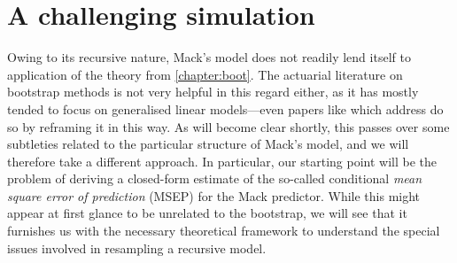 \documentclass[a4paper]{book}
\begin{document}
\section{A challenging simulation} \label{sec:mack-challenge}

Owing to its recursive nature, Mack's model does not readily lend itself to application of the theory from \cref{chapter:boot}. The actuarial literature on bootstrap methods is not very helpful in this regard either, as it has mostly tended to focus on generalised linear models---even papers like \cite{england:dist} which address  do so by reframing it in this way. As will become clear shortly, this passes over some subtleties related to the particular structure of Mack's model, and we will therefore take a different approach. In particular, our starting point will be the problem of deriving a closed-form estimate of the so-called conditional \emph{mean square error of prediction} (MSEP) for the Mack predictor. While this might appear at first glance to be unrelated to the bootstrap, we will see that it furnishes us with the necessary theoretical framework to understand the special issues involved in resampling a recursive model.
\end{document}
